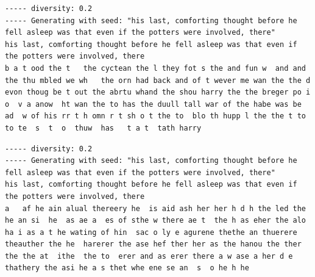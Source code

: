 \documentclass{article}[]
\begin{document}
\begin{lstlisting}[label=lstm-harry-all-low-diverse, caption={LSTM Harry Potter after 60 epochs, diversity=0.2}]
----- diversity: 0.2
----- Generating with seed: "his last, comforting thought before he fell asleep was that even if the potters were involved, there"
his last, comforting thought before he fell asleep was that even if the potters were involved, there
b a t ood the t   the cyctean the l they fot s the and fun w  and and the thu mbled we wh   the orn had back and of t wever me wan the the d evon thoug be t out the abrtu whand the shou harry the the breger po i o  v a anow  ht wan the to has the duull tall war of the habe was be ad  w of his rr t h omn r t sh o t the to  blo th hupp l the the t to to te  s  t  o  thuw  has   t a t  tath harry
\end{lstlisting}

\begin{lstlisting}[label=gru-harry-all-low-diverse, caption={GRU Harry Potter after 60 epochs, diversity=0.2}]
----- diversity: 0.2
----- Generating with seed: "his last, comforting thought before he fell asleep was that even if the potters were involved, there"
his last, comforting thought before he fell asleep was that even if the potters were involved, there
a   af he ain alual thereery he  is aid ash her her h d h the led the he an si  he  as ae a  es of sthe w there ae t  the h as eher the alo ha i as a t he wating of hin  sac o ly e agurene thethe an thuerere theauther the he  harerer the ase hef ther her as the hanou the ther the the at  ithe  the to  erer and as erer there a w ase a her d e thathery the asi he a s thet whe ene se an  s  o he h he
\end{lstlisting}


 

\end{document}
